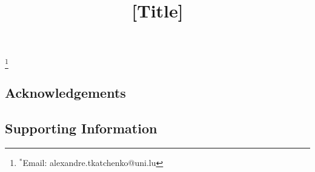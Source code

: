 

\title{[Title]}



\nocite{achemso-control}


\begingroup
\renewcommand\thefootnote{}\footnote{$^*$Email: alexandre.tkatchenko@uni.lu}%
\addtocounter{footnote}{-1}%
\endgroup



\subsection{Acknowledgements}

\subsection{Supporting Information}

\begingroup
\setlength\bibsep{0pt}
\footnotesize

\endgroup


